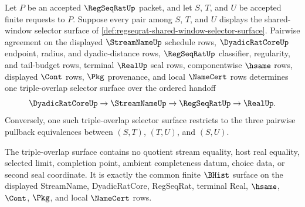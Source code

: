 \begin{theorem}
\label{thm:regseqrat-shared-window-triple-overlap-cocycle}
Let $P$ be an accepted $\RegSeqRatUp$ packet, and let $S$, $T$, and $U$ be accepted finite requests to $P$. Suppose every pair among $S$, $T$, and $U$ displays the shared-window selector surface of \autoref{def:regseqrat-shared-window-selector-surface}. Pairwise agreement on the displayed $\StreamNameUp$ schedule rows, $\DyadicRatCoreUp$ endpoint, radius, and dyadic-distance rows, $\RegSeqRatUp$ classifier, regularity, and tail-budget rows, terminal $\RealUp$ seal rows, componentwise $\hsame$ rows, displayed $\Cont$ rows, $\Pkg$ provenance, and local $\NameCert$ rows determines one triple-overlap selector surface over the ordered handoff
$$
\DyadicRatCoreUp \to \StreamNameUp \to \RegSeqRatUp \to \RealUp .
$$
Conversely, one such triple-overlap selector surface restricts to the three pairwise pullback equivalences between $(S,T)$, $(T,U)$, and $(S,U)$.

The triple-overlap surface contains no quotient stream equality, host real equality, selected limit, completion point, ambient completeness datum, choice data, or second seal coordinate. It is exactly the common finite $\BHist$ surface on the displayed StreamName, DyadicRatCore, RegSeqRat, terminal Real, $\hsame$, $\Cont$, $\Pkg$, and local $\NameCert$ rows.
\end{theorem}
